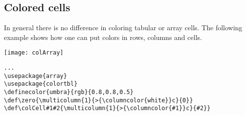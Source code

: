 \begin{table}[htb]
\subsection{Colored cells}\label{sub:color}
In general there is no difference in coloring tabular or array cells. The following example
shows how one can put colors in rows, columns and cells.

\medskip\noindent
\texttt{[image: colArray]}



\medskip
\begin{lstlisting}[xrightmargin=-\marginparwidth]
...
\usepackage{array}
\usepackage{colortbl}
\definecolor{umbra}{rgb}{0.8,0.8,0.5}
\def\zero{\multicolumn{1}{>{\columncolor{white}}c}{0}}
\def\colCell#1#2{\multicolumn{1}{>{\columncolor{#1}}c}{#2}}


\end{lstlisting}
\end{table}
